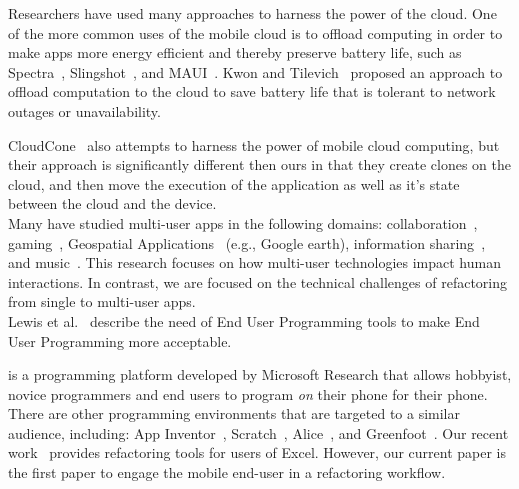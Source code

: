 \documentclass[preprint]{sigplanconf}
\begin{document}
Researchers have used many approaches to harness the power of the cloud.
One of the more common uses of the mobile cloud is to offload computing in order to make apps more energy efficient and thereby preserve battery life, such as Spectra~\cite{flinn2002balancing}, Slingshot~\cite{su2005slingshot}, and MAUI~\cite{cuervo2010maui}.  
Kwon and Tilevich~\cite{kwon2012energy} proposed an approach to offload computation to the cloud to save battery life that is tolerant to network outages or unavailability.

CloudCone~\cite{chun2011clonecloud} also attempts to harness the power of mobile cloud computing, but their approach is significantly different then ours in that they create clones on the cloud, and then move the execution of the application as well as it's state between the cloud and the device.  \\

Many have studied multi-user apps in the following domains: collaboration~\cite{Yuill:multiuserColab, Lopez-Gulliver:imageprocessing}, gaming~\cite{Leichtenstern:multiuserGames}, Geospatial Applications~\cite{Forlines:geospatial} (e.g., Google earth), information sharing~\cite{Nacenta:2012:LMM:2307798.2307816}, and music~\cite{Sorensen:2012:ISM:2399016.2399094}. This research focuses on how multi-user technologies impact human interactions. In contrast, we are focused on the technical challenges of refactoring from single to multi-user apps. \\

Lewis et al.~\cite{lewis2009report} describe the need of End User Programming tools to make End User Programming more acceptable.  

\TD is a programming platform developed by Microsoft Research that allows hobbyist, novice programmers and end users  to program \emph{on} their phone for their phone.  There are other programming environments that are targeted to a similar audience, including:  App Inventor~\cite{Wolber}, Scratch~\cite{maloney2010scratch}, Alice~\cite{cooper2010design}, and Greenfoot~\cite{kolling2010greenfoot}. 
Our recent work~\cite{badame2012refactoring} provides refactoring tools for users of Excel. 
However, our current paper is the first paper to engage the mobile end-user in a refactoring workflow.

\end{document}
